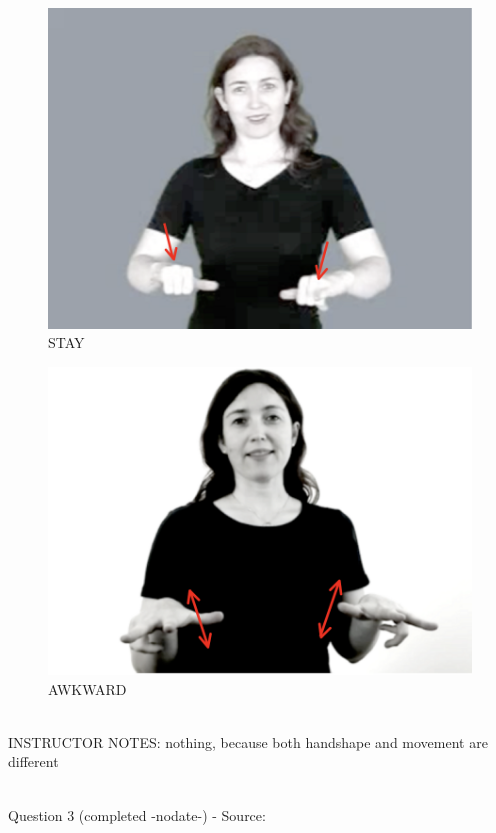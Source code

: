 \documentclass[12pt]{article}
\begin{document}
\begin{figure}[H]
\includegraphics{../images/asl_stay.png}
\caption{STAY}
\end{figure}
\begin{figure}[H]
\includegraphics{../images/asl_awkward.png}
\caption{AWKWARD}
\end{figure}

~\\
INSTRUCTOR NOTES: nothing, because both handshape and movement are different


~\\

{\large Question 3} (completed -nodate-) - Source: \\
\end{document}
